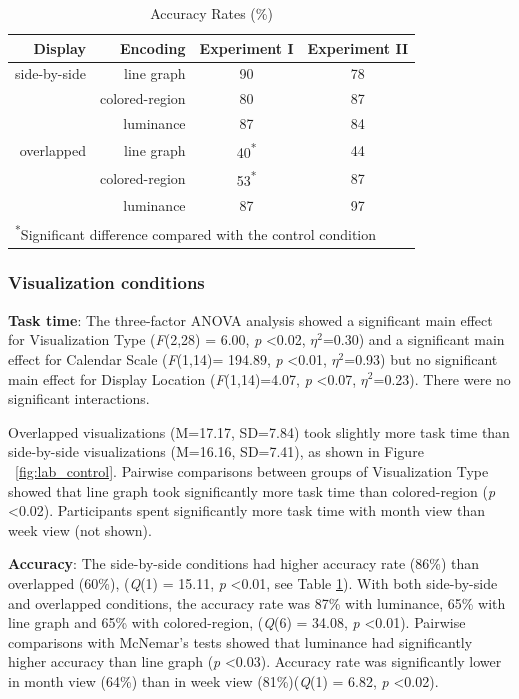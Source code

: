 \documentclass[12pt,oneside]{book}
\begin{document}
\begin{table} 
\begin{center}
\begin{tabular}{rrcc}
\hline
 Display   &  Encoding  &  Experiment I   &   Experiment II   \\
\hline
 side-by-side   &    line graph      &  90     &  78  \\
                &    colored-region  &  80     &  87  \\
                &    luminance       &  87     &  84  \\
\hline
 overlapped     &    line graph      &  40\textsuperscript{*}      &  44  \\
                &    colored-region  &  53\textsuperscript{*}     &  87  \\
                &    luminance       &  87     &  97  \\
\hline
\multicolumn{4}{l}{\textsuperscript{*}\footnotesize{Significant difference compared with the control condition}}
\end{tabular}
\caption{Accuracy Rates (\%)}
\label{table:accuracy}

\end{center}
\end{table}



\subsubsection{Visualization conditions}

\textbf{Task time}: The three-factor ANOVA analysis showed a significant main effect for Visualization Type (\textit{F}(2,28) = 6.00, \textit{p} \textless 0.02, $\eta^2$=0.30) and a significant main effect for Calendar Scale (\textit{F}(1,14)= 194.89, \textit{p} \textless 0.01, $\eta^2$=0.93) but no significant main effect for Display Location (\textit{F}(1,14)=4.07, \textit{p} \textless 0.07, $\eta^2$=0.23). There were no significant interactions. 

Overlapped visualizations (M=17.17, SD=7.84) took slightly more task time than side-by-side visualizations (M=16.16, SD=7.41), as shown in Figure ~\ref{fig:lab_control}. Pairwise comparisons between groups of Visualization Type showed that line graph took significantly more task time than colored-region (\textit{p} \textless 0.02). Participants spent significantly more task time with month view than week view (not shown).

\textbf{Accuracy}:
The side-by-side conditions had higher accuracy rate (86\%) than overlapped (60\%), (\textit{Q}(1) = 15.11, \textit{p} \textless 0.01, see Table \ref{table:accuracy}). With both side-by-side and overlapped conditions, the accuracy rate was 87\% with luminance, 65\% with line graph and 65\% with colored-region, (\textit{Q}(6) = 34.08, \textit{p} \textless 0.01). Pairwise comparisons with McNemar's tests showed that luminance had significantly higher accuracy than line graph (\textit{p}  \textless 0.03). Accuracy rate was significantly lower in month view (64\%) than in week view (81\%)(\textit{Q}(1) = 6.82, \textit{p}  \textless 0.02).
\end{document}
